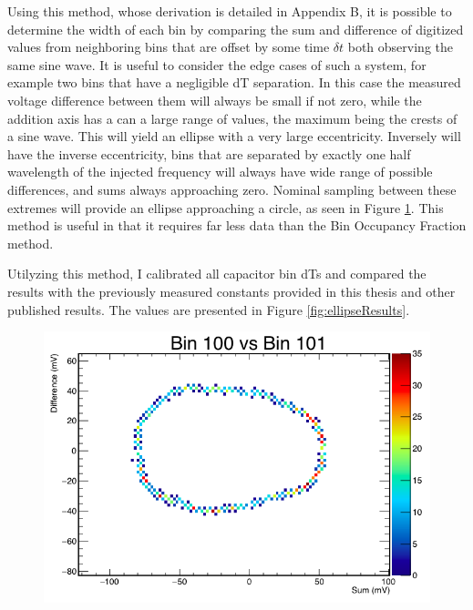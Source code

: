 		Using this method, whose derivation is detailed in Appendix B, it is possible to determine the width of each bin by comparing the sum and difference of digitized values from neighboring bins that are offset by some time $\delta t$ both observing the same sine wave.  It is useful to consider the edge cases of such a system, for example two bins that have a negligible dT separation.  In this case the measured voltage difference between them will always be small if not zero, while the addition axis has a can a large range of values, the maximum being the crests of a sine wave. This will yield an ellipse with a very large eccentricity.  Inversely will have the inverse eccentricity, bins that are separated by exactly one half wavelength of the injected frequency will always have wide range of possible differences, and sums always approaching zero.  Nominal sampling between these extremes will provide an ellipse approaching a circle, as seen in Figure \ref{fig:ellipseMethodExample}.  This method is useful in that it requires far less data than the Bin Occupancy Fraction method.  
		
		Utilyzing this method, I calibrated all capacitor bin dTs and compared the results with the previously measured constants provided in this thesis and other published results\cite{BenSThesis}.  The values are presented in Figure \ref{fig:ellipseResults}.
		
	\begin{figure}
		\includegraphics[width=\textwidth]{figures/ellipseMethodExample}
		\caption{}
		\label{fig:ellipseMethodExample}
	\end{figure}

